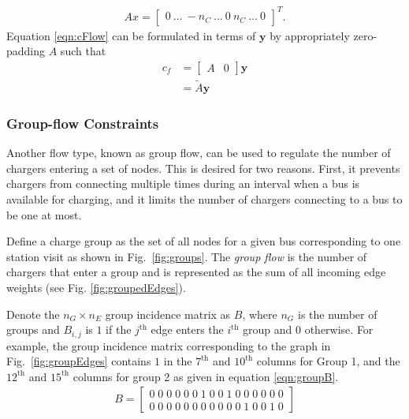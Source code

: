 \begin{align}\label{eqn:cFlow}
	Ax = \begin{bmatrix} 0  \ \hdots \ -n_C \ \hdots \ 0 \ n_C \ \hdots \ 0\end{bmatrix}^T.
\end{align}
Equation \ref{eqn:cFlow} can be formulated in terms of $\mathbf{y}$ by appropriately zero-padding $A$ such that
\begin{equation}\label{eqn:cFlow2}
	\begin{aligned}
		c_f &= \begin{bmatrix}A & 0 \end{bmatrix}\mathbf{y}\\
		    &= \tilde{A} \mathbf{y} 
	\end{aligned}
\end{equation}
\subsubsection{Group-flow Constraints}
\par Another flow type, known as group flow, can be used to regulate the number of chargers entering a set of nodes. This is desired for two reasons.  First, it prevents chargers from connecting multiple times during an interval when a bus is available for charging, and it limits the number of chargers connecting to a bus to be one at most.
\par Define a charge group as the set of all nodes for a given bus corresponding to one station visit as shown in Fig.~\ref{fig:groups}. The \textit{group flow} is the number of chargers that enter a group and is represented as the sum of all incoming edge weights (see Fig. \ref{fig:groupedEdges}). 
\par Denote the $n_G \times n_E$ group incidence matrix as $B$, where $n_G$ is the number of groups and $B_{i,j}$ is $1$ if the $j^{\text{th}}$ edge enters the $i^{\text{th}}$ group and $0$ otherwise. For example, the group incidence matrix corresponding to the graph in Fig.~\ref{fig:groupEdges} contains $1$ in the $7^{\text{th}}$ and $10^{\text{th}}$ columns for Group 1, and the $12^{\text{th}}$ and $15^{\text{th}}$ columns for group 2 as given in equation \ref{eqn:groupB}.
\begin{align}\label{eqn:groupB}
	B = \begin{bmatrix}0 \; 0 \; 0 \; 0 \; 0 \; 0 \; 1 \; 0 \; 0 \; 1 \; 0 \; 0 \; 0 \; 0 \; 0 \; 0\\
	                   0 \; 0 \; 0 \; 0 \; 0 \; 0 \; 0 \; 0 \; 0 \; 0 \; 0 \; 1 \; 0 \; 0 \; 1 \; 0\end{bmatrix}
\end{align}

